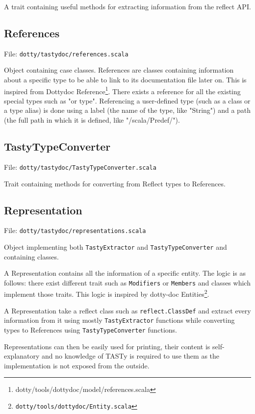 \documentclass{report}
\begin{document}
A trait containing useful methods for extracting information from the reflect API.

\subsection{References}
File: \texttt{dotty/tastydoc/references.scala}

Object containing case classes. References are classes containing information about a specific type to be able to link to its documentation file later on. This is inspired from Dottydoc Reference\footnote{dotty/tools/dottydoc/model/references.scala}. There exists a reference for all the existing special types such as "or type". Referencing a user-defined type (such as a class or a type alias) is done using a label (the name of the type, like "String") and a path (the full path in which it is defined, like "/scala/Predef/").

\subsection{TastyTypeConverter}
File: \texttt{dotty/tastydoc/TastyTypeConverter.scala}

Trait containing methods for converting from Reflect types to References.

\subsection{Representation}
\label{sec:representation}
File: \texttt{dotty/tastydoc/representations.scala}

Object implementing both \texttt{TastyExtractor} and \texttt{TastyTypeConverter} and containing classes.

A Representation contains all the information of a specific entity. The logic is as follows: there exist different trait such as \texttt{Modifiers} or \texttt{Members} and classes which implement those traits. This logic is inspired by dotty-doc Entities\footnote{\texttt{dotty/tools/dottydoc/Entity.scala}}.

A Representation take a reflect class such as \texttt{reflect.ClassDef} and extract every information from it using mostly \texttt{TastyExtractor} functions while converting types to References using \texttt{TastyTypeConverter} functions.

Representations can then be easily used for printing, their content is self-explanatory and no knowledge of TASTy is required to use them as the implementation is not exposed from the outside.
\end{document}
